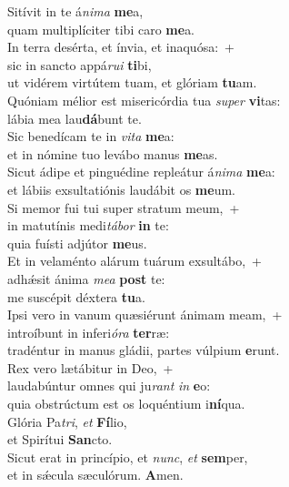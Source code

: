 \evenverse Sitívit in te á\textit{ni}\textit{ma} \textbf{me}a,~\*\\
\evenverse quam multiplíciter tibi caro \textbf{me}a.\\
\oddverse In terra desérta, et ínvia, et inaquósa:~+\\
\oddverse  sic in sancto appá\textit{ru}\textit{i} \textbf{ti}bi,~\*\\
\oddverse ut vidérem virtútem tuam, et glóriam \textbf{tu}am.\\
\evenverse Quóniam mélior est misericórdia tua \textit{su}\textit{per} \textbf{vi}tas:~\*\\
\evenverse lábia mea lau\textbf{dá}bunt te.\\
\oddverse Sic benedícam te in \textit{vi}\textit{ta} \textbf{me}a:~\*\\
\oddverse et in nómine tuo levábo manus \textbf{me}as.\\
\evenverse Sicut ádipe et pinguédine repleátur á\textit{ni}\textit{ma} \textbf{me}a:~\*\\
\evenverse et lábiis exsultatiónis laudábit os \textbf{me}um.\\
\oddverse Si memor fui tui super stratum meum,~+\\
\oddverse  in matutínis medi\textit{tá}\textit{bor} \textbf{in} te:~\*\\
\oddverse quia fuísti adjútor \textbf{me}us.\\
\evenverse Et in velaménto alárum tuárum exsultábo,~+\\
\evenverse  adhǽsit ánima \textit{me}\textit{a} \textbf{post} te:~\*\\
\evenverse me suscépit déxtera \textbf{tu}a.\\
\oddverse Ipsi vero in vanum quæsiérunt ánimam meam,~+\\
\oddverse  introíbunt in inferi\textit{ó}\textit{ra} \textbf{ter}ræ:~\*\\
\oddverse tradéntur in manus gládii, partes vúlpium \textbf{e}runt.\\
\evenverse Rex vero lætábitur in Deo,~+\\
\evenverse  laudabúntur omnes qui ju\textit{rant} \textit{in} \textbf{e}o:~\*\\
\evenverse quia obstrúctum est os loquéntium i\textbf{ní}qua.\\
\oddverse Glória Pa\textit{tri}, \textit{et} \textbf{Fí}lio,~\*\\
\oddverse et Spirítui \textbf{San}cto.\\
\evenverse Sicut erat in princípio, et \textit{nunc}, \textit{et} \textbf{sem}per,~\*\\
\evenverse et in sǽcula sæculórum. \textbf{A}men.\\
